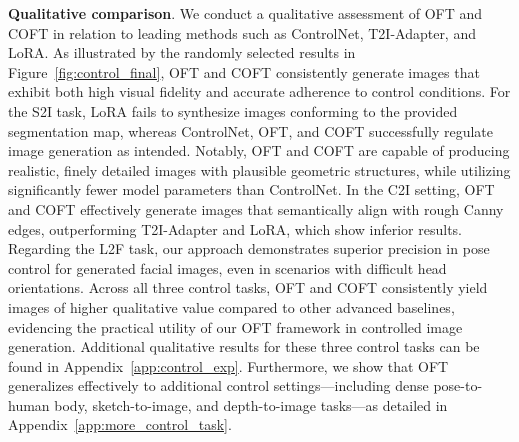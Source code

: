 \begin{itemize}[leftmargin=*,nosep]
\begin{abstract}
Large-scale text-to-image diffusion models have demonstrated remarkable prowess in synthesizing photorealistic images conditioned on textual descriptions. A key open question is how to efficiently steer or modulate these sophisticated models for various downstream applications. To address this, we present Orthogonal Finetuning~(OFT), a systematic approach for refining text-to-image diffusion models for specific downstream tasks. Distinct from prior finetuning approaches, OFT can formally maintain hyperspherical energy, capturing pairwise neuron relations on the unit hypersphere. We observe that conserving this attribute is essential to uphold the semantic generative competence of text-to-image diffusion models. To further bolster the robustness of finetuning, we introduce Constrained Orthogonal Finetuning (COFT), which applies a supplementary radius constraint to the hypersphere. Our focus lies on two significant text-to-image finetuning problems: subject-driven generation—where the model generates customized images of a target subject given a handful of subject examples and a prompt—and controllable generation—where the model responds to additional guidance signals. Experimental results demonstrate that the OFT method surpasses established baselines in both output quality and speed of convergence.
\end{abstract}

\textbf{Qualitative comparison}. We conduct a qualitative assessment of OFT and COFT in relation to leading methods such as ControlNet, T2I-Adapter, and LoRA. As illustrated by the randomly selected results in Figure~\ref{fig:control_final}, OFT and COFT consistently generate images that exhibit both high visual fidelity and accurate adherence to control conditions. For the S2I task, LoRA fails to synthesize images conforming to the provided segmentation map, whereas ControlNet, OFT, and COFT successfully regulate image generation as intended. Notably, OFT and COFT are capable of producing realistic, finely detailed images with plausible geometric structures, while utilizing significantly fewer model parameters than ControlNet. In the C2I setting, OFT and COFT effectively generate images that semantically align with rough Canny edges, outperforming T2I-Adapter and LoRA, which show inferior results. Regarding the L2F task, our approach demonstrates superior precision in pose control for generated facial images, even in scenarios with difficult head orientations. Across all three control tasks, OFT and COFT consistently yield images of higher qualitative value compared to other advanced baselines, evidencing the practical utility of our OFT framework in controlled image generation. Additional qualitative results for these three control tasks can be found in Appendix~\ref{app:control_exp}. Furthermore, we show that OFT generalizes effectively to additional control settings—including dense pose-to-human body, sketch-to-image, and depth-to-image tasks—as detailed in Appendix~\ref{app:more_control_task}.


\end{itemize}
